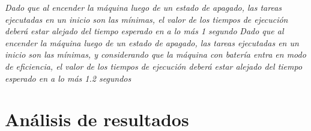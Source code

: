 \documentclass{memoria}
\begin{document}
\emph{Dado que al encender la máquina luego de un estado de apagado, las tareas ejecutadas en un inicio son las mínimas, el valor de los tiempos de ejecución deberá estar alejado del tiempo esperado en a lo más 1 segundo }
\emph{Dado que al encender la máquina luego de un estado de apagado, las tareas ejecutadas en un inicio son las mínimas, y considerando que la máquina con batería entra en modo de eficiencia, el valor de los tiempos de ejecución deberá estar alejado del tiempo esperado en a lo más 1.2 segundos }
\section{Análisis de resultados}
\end{document}
